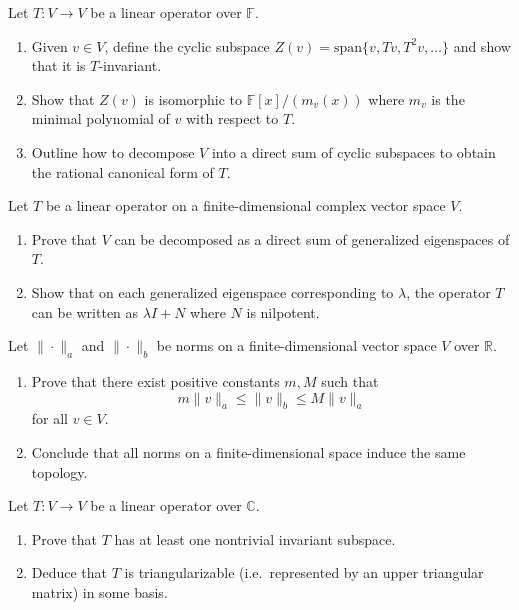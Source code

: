 \documentclass[11pt]{article}
\begin{document}
\begin{problem}
Let $T: V \to V$ be a linear operator over $\mathbb{F}$.
\begin{enumerate}
    \item Given $v \in V$, define the cyclic subspace $Z(v) = \mathrm{span}\{ v, T v, T^2 v, \dots \}$ and show that it is $T$-invariant.
    \item Show that $Z(v)$ is isomorphic to $\mathbb{F}[x]/(m_v(x))$ where $m_v$ is the minimal polynomial of $v$ with respect to $T$.
    \item Outline how to decompose $V$ into a direct sum of cyclic subspaces to obtain the rational canonical form of $T$.
\end{enumerate}
\end{problem}

\begin{problem}
Let $T$ be a linear operator on a finite-dimensional complex vector space $V$.
\begin{enumerate}
    \item Prove that $V$ can be decomposed as a direct sum of generalized eigenspaces of $T$.
    \item Show that on each generalized eigenspace corresponding to $\lambda$, the operator $T$ can be written as $\lambda I + N$ where $N$ is nilpotent.
\end{enumerate}
\end{problem}

\begin{problem}
Let $\|\cdot\|_a$ and $\|\cdot\|_b$ be norms on a finite-dimensional vector space $V$ over $\mathbb{R}$.
\begin{enumerate}
    \item Prove that there exist positive constants $m, M$ such that
    \[
    m \|v\|_a \le \|v\|_b \le M \|v\|_a
    \]
    for all $v \in V$.
    \item Conclude that all norms on a finite-dimensional space induce the same topology.
\end{enumerate}
\end{problem}

\begin{problem}
Let $T: V \to V$ be a linear operator over $\mathbb{C}$.
\begin{enumerate}
    \item Prove that $T$ has at least one nontrivial invariant subspace.
    \item Deduce that $T$ is triangularizable (i.e.\ represented by an upper triangular matrix) in some basis.
\end{enumerate}
\end{problem}
\end{document}
